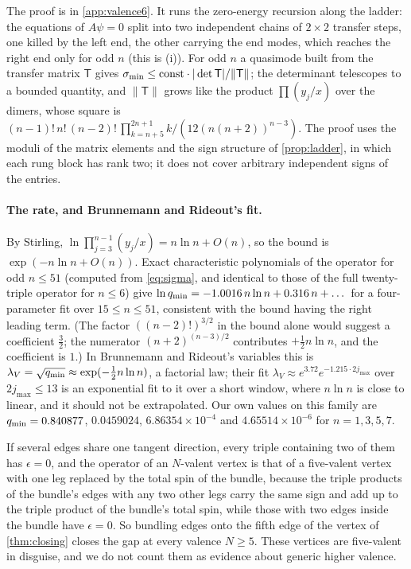 The proof is in \cref{app:valence6}. It runs the zero-energy recursion along the ladder:
the equations of $A\psi=0$ split into two independent chains of $2\times2$ transfer
steps, one killed by the left end, the other carrying the end modes, which reaches the
right end only for odd $n$ (this is (i)). For odd $n$ a quasimode built from the
transfer matrix $\mathsf T$ gives $\sigma_{\min}\le\mathrm{const}\cdot|\det\mathsf T|/\|\mathsf T\|$; the determinant
telescopes to a bounded quantity, and $\|\mathsf T\|$ grows like the product $\prod(y_j/x)$ over
the dimers, whose square is $(n-1)!\,n!\,(n-2)!\,\prod_{k=n+5}^{2n+1}k/(12(n(n+2))^{n-3})$.
The proof uses the moduli of the matrix elements and the sign structure of
\cref{prop:ladder}, in which each rung block has rank two; it does not cover arbitrary
independent signs of the entries.

\paragraph{The rate, and Brunnemann and Rideout's fit.}
By Stirling, $\ln\prod_{j=3}^{n-1}(y_j/x)=n\ln n+O(n)$, so the bound is
$\exp(-n\ln n+O(n))$. Exact characteristic polynomials of the operator for odd
$n\le51$ (computed from \eqref{eq:sigma}, and identical to those of the full
twenty-triple operator for $n\le6$) give $\ln q_{\min}=-1.0016\,n\ln n+0.316\,n+\dots$ for a four-parameter fit over
$15\le n\le51$, consistent with the bound having the right leading term. (The factor
$((n-2)!)^{3/2}$ in the bound alone would suggest a coefficient $\frac32$; the numerator
$(n+2)^{(n-3)/2}$ contributes $+\frac12n\ln n$, and the coefficient is $1$.) In Brunnemann and Rideout's variables
this is $\lambda_V=\sqrt{q_{\min}}\approx\exp(-\frac12n\ln n)$, a factorial law; their fit
$\lambda_V\approx e^{3.72}e^{-1.215\cdot2j_{\max}}$ over $2j_{\max}\le13$ is an
exponential fit to it over a short window, where $n\ln n$ is close to linear, and it
should not be extrapolated. Our own values on this family are $q_{\min}=0.840877$,
$0.0459024$, $6.86354\times10^{-4}$ and $4.65514\times10^{-6}$ for $n=1,3,5,7$.

\begin{remark}
If several edges share one tangent direction, every triple containing two of them has
$\epsilon=0$, and the operator of an $N$-valent vertex is that of a five-valent vertex
with one leg replaced by the total spin of the bundle, because the triple products of
the bundle's edges with any two other legs carry the same sign and add up to the triple
product of the bundle's total spin, while those with two edges inside the bundle have
$\epsilon=0$. So bundling edges onto the fifth edge of the vertex of
\cref{thm:closing} closes the gap at every valence $N\ge5$. These vertices are five-valent
in disguise, and we do not count them as evidence about generic higher valence.
\end{remark}
